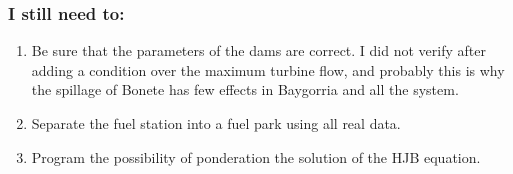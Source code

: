 \documentclass[aspectratio=169]{beamer}\usepackage[utf8]{inputenc}
\begin{document}
\begin{frame}
\begin{figure}[ht!]
\centering
{}
\end{figure}
\end{frame}

\begin{frame}
\begin{figure}[ht!]
\centering
{}
\end{figure}
\end{frame}

\begin{frame}\frametitle{I still need to:}
\begin{enumerate}

\item Be sure that the parameters of the dams are correct. I did not verify after adding a condition over the maximum turbine flow, and probably this is why the spillage of Bonete has few effects in Baygorria and all the system.

\item Separate the fuel station into a fuel park using all real data.

\item Program the possibility of ponderation the solution of the HJB equation.

\end{enumerate}
\end{frame}
\end{document}
